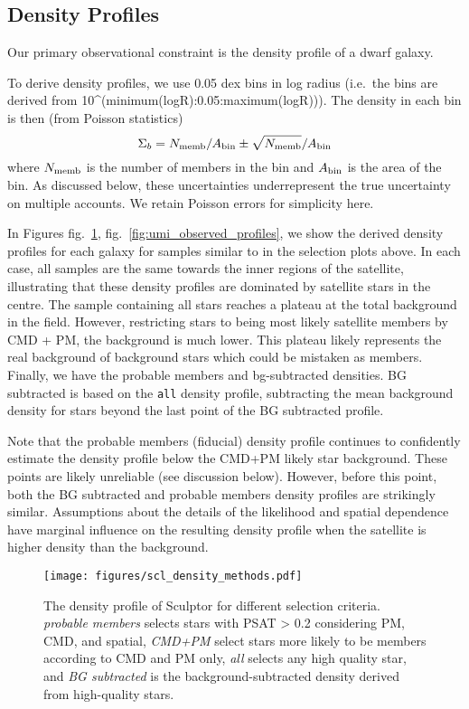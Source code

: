 \subsection{Density Profiles}\label{density-profiles}

Our primary observational constraint is the density profile of a dwarf
galaxy.

To derive density profiles, we use 0.05 dex bins in log radius (i.e.~the
bins are derived from 10\^{}(minimum(logR):0.05:maximum(logR))). The
density in each bin is then (from Poisson statistics) \[
\Sigma_b = N_{\rm memb} / A_{\rm bin} \pm \sqrt{N_{\rm memb}} / A_{\rm bin}
\] where \(N_{\rm memb}\) is the number of members in the bin and
\(A_{\rm bin}\) is the area of the bin. As discussed below, these
uncertainties underrepresent the true uncertainty on multiple accounts.
We retain Poisson errors for simplicity here.

In Figures fig.~\ref{fig:scl_observed_profiles},
fig.~\ref{fig:umi_observed_profiles}, we show the derived density
profiles for each galaxy for samples similar to in the selection plots
above. In each case, all samples are the same towards the inner regions
of the satellite, illustrating that these density profiles are dominated
by satellite stars in the centre. The sample containing all stars
reaches a plateau at the total background in the field. However,
restricting stars to being most likely satellite members by CMD + PM,
the background is much lower. This plateau likely represents the real
background of background stars which could be mistaken as members.
Finally, we have the probable members and bg-subtracted densities. BG
subtracted is based on the \texttt{all} density profile, subtracting the
mean background density for stars beyond the last point of the BG
subtracted profile.

Note that the probable members (fiducial) density profile continues to
confidently estimate the density profile below the CMD+PM likely star
background. These points are likely unreliable (see discussion below).
However, before this point, both the BG subtracted and probable members
density profiles are strikingly similar. Assumptions about the details
of the likelihood and spatial dependence have marginal influence on the
resulting density profile when the satellite is higher density than the
background.

\begin{figure}
\centering
\texttt{[image: figures/scl\_density\_methods.pdf]}
\caption[Sculptor density profiles]{The density profile of Sculptor for
different selection criteria. \emph{probable members} selects stars with
PSAT \textgreater{} 0.2 considering PM, CMD, and spatial, \emph{CMD+PM}
select stars more likely to be members according to CMD and PM only,
\emph{all} selects any high quality star, and \emph{BG subtracted} is
the background-subtracted density derived from high-quality
stars.}\label{fig:scl_observed_profiles}
\end{figure}

